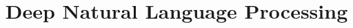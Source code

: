 \documentclass[xcolor=dvipsnames,compress,t,pdf,9pt]{beamer}
\title[\insertframenumber /\inserttotalframenumber]{Deep Natural Language Processing}
\begin{document}
	\begin{frame}
	\titlepage
	\end{frame}

	
	
\end{document}
